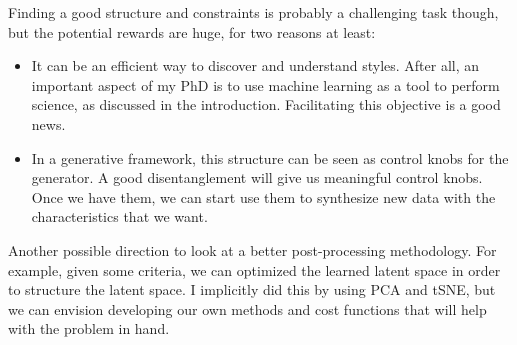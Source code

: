     \par Finding a good structure and constraints is probably a challenging task though, but the potential rewards are huge, for two reasons at least:
    \begin{itemize}
      \item It can be an efficient way to discover and understand styles. After all, an important aspect of my PhD is to use machine learning as a tool to perform science, as discussed in the introduction. Facilitating this objective is a good news.
      \item In a generative framework, this structure can be seen as control knobs for the generator. A good disentanglement will give us meaningful control knobs. Once we have them, we can start use them to synthesize new data with the characteristics that we want.
    \end{itemize}

    \par Another possible direction to look at a better post-processing methodology. For example, given some criteria, we can optimized the learned latent space in order to structure the latent space. I implicitly did this by using PCA and tSNE, but we can envision developing our own methods and cost functions that will help with the problem in hand.


